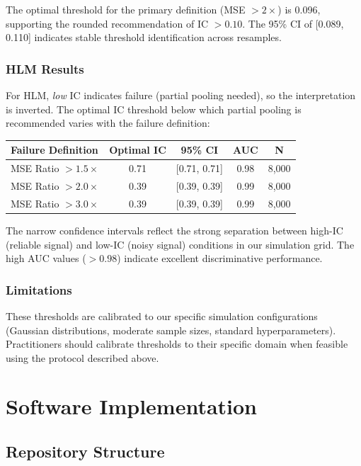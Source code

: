 \documentclass[10pt]{article} %
\theoremstyle{plain}
\theoremstyle{definition}
\begin{document}
The optimal threshold for the primary definition (MSE $> 2\times$) is 0.096, supporting the rounded recommendation of IC $> 0.10$. The 95\% CI of [0.089, 0.110] indicates stable threshold identification across resamples.

\subsubsection{HLM Results}

For HLM, \emph{low} IC indicates failure (partial pooling needed), so the interpretation is inverted. The optimal IC threshold below which partial pooling is recommended varies with the failure definition:

\begin{center}
\begin{tabular}{lcccc}
\toprule
Failure Definition & Optimal IC & 95\% CI & AUC & N \\
\midrule
MSE Ratio $> 1.5\times$ & 0.71 & [0.71, 0.71] & 0.98 & 8,000 \\
MSE Ratio $> 2.0\times$ & 0.39 & [0.39, 0.39] & 0.99 & 8,000 \\
MSE Ratio $> 3.0\times$ & 0.39 & [0.39, 0.39] & 0.99 & 8,000 \\
\bottomrule
\end{tabular}
\end{center}

The narrow confidence intervals reflect the strong separation between high-IC (reliable signal) and low-IC (noisy signal) conditions in our simulation grid. The high AUC values ($> 0.98$) indicate excellent discriminative performance.

\subsubsection{Limitations}

These thresholds are calibrated to our specific simulation configurations (Gaussian distributions, moderate sample sizes, standard hyperparameters). Practitioners should calibrate thresholds to their specific domain when feasible using the protocol described above.
\section{Software Implementation}
\label{app:software}

\subsection{Repository Structure}
\end{document}
